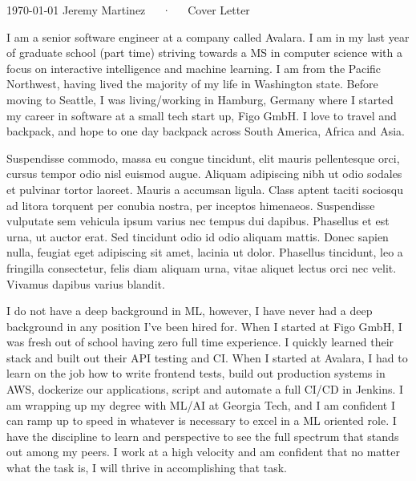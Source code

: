 \documentclass[11pt, a4paper]{awesome-cv}
\begin{document}
\makecvheader[R]

\makecvfooter
  {\today}
  {Jeremy Martinez~~~·~~~Cover Letter}
  {}

\makelettertitle

\begin{cvletter}

I am a senior software engineer at a company called Avalara. I am in my last year of graduate school (part time) striving towards a MS in computer science with a focus on interactive intelligence and machine learning. I am from the Pacific Northwest, having lived the majority of my life in Washington state. Before moving to Seattle, I was living/working in Hamburg, Germany where I started my career in software at a small tech start up, Figo GmbH. I love to travel and backpack, and hope to one day backpack across South America, Africa and Asia.

Suspendisse commodo, massa eu congue tincidunt, elit mauris pellentesque orci, cursus tempor odio nisl euismod augue. Aliquam adipiscing nibh ut odio sodales et pulvinar tortor laoreet. Mauris a accumsan ligula. Class aptent taciti sociosqu ad litora torquent per conubia nostra, per inceptos himenaeos. Suspendisse vulputate sem vehicula ipsum varius nec tempus dui dapibus. Phasellus et est urna, ut auctor erat. Sed tincidunt odio id odio aliquam mattis. Donec sapien nulla, feugiat eget adipiscing sit amet, lacinia ut dolor. Phasellus tincidunt, leo a fringilla consectetur, felis diam aliquam urna, vitae aliquet lectus orci nec velit. Vivamus dapibus varius blandit.

I do not have a deep background in ML, however, I have never had a deep background in any position I've been hired for. When I started at Figo GmbH, I was fresh out of school having zero full time experience. I quickly learned their stack and built out their API testing and CI. When I started at Avalara, I had to learn on the job how to write frontend tests, build out production systems in AWS, dockerize our applications, script and automate a full CI/CD in Jenkins. I am wrapping up my degree with ML/AI at Georgia Tech, and I am confident I can ramp up to speed in whatever is necessary to excel in a ML oriented role. I have the discipline to learn and perspective to see the full spectrum that stands out among my peers. I work at a high velocity and am confident that no matter what the task is, I will thrive in accomplishing that task.

\end{cvletter}


\makeletterclosing
\end{document}
